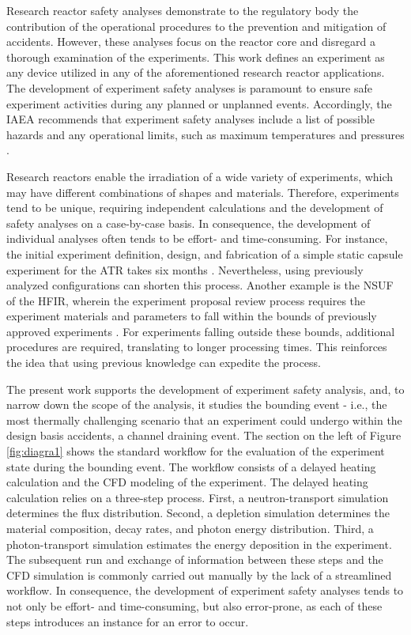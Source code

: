 Research reactor safety analyses demonstrate to the regulatory body the contribution of the operational procedures to the prevention and mitigation of accidents.
However, these analyses focus on the reactor core and disregard a thorough examination of the experiments.
This work defines an experiment as any device utilized in any of the aforementioned research reactor applications.
The development of experiment safety analyses is paramount to ensure safe experiment activities during any planned or unplanned events.
Accordingly, the \gls*{IAEA} recommends that experiment safety analyses include a list of possible hazards and any operational limits, such as maximum temperatures and pressures \cite{noauthor_safety_2012}.

Research reactors enable the irradiation of a wide variety of experiments, which may have different combinations of shapes and materials.
Therefore, experiments tend to be unique, requiring independent calculations and the development of safety analyses on a case-by-case basis.
In consequence, the development of individual analyses often tends to be effort- and time-consuming.
For instance, the initial experiment definition, design, and fabrication of a simple static capsule experiment for the \gls*{ATR} takes six months \cite{inl_advanced_2009}.
Nevertheless, using previously analyzed configurations can shorten this process.
%
Another example is the \gls*{NSUF} of the \gls*{HFIR}, wherein the experiment proposal review process requires the experiment materials and parameters to fall within the bounds of previously approved experiments \cite{hfir}.
For experiments falling outside these bounds, additional procedures are required, translating to longer processing times.
This reinforces the idea that using previous knowledge can expedite the process.

The present work supports the development of experiment safety analysis, and, to narrow down the scope of the analysis, it studies the bounding event - i.e., the most thermally challenging scenario that an experiment could undergo within the design basis accidents, a channel draining event.
The section on the left of Figure \ref{fig:diagra1} shows the standard workflow for the evaluation of the experiment state during the bounding event.
The workflow consists of a delayed heating calculation and the \gls*{CFD} modeling of the experiment.
The delayed heating calculation relies on a three-step process.
First, a neutron-transport simulation determines the flux distribution.
Second, a depletion simulation determines the material composition, decay rates, and photon energy distribution.
Third, a photon-transport simulation estimates the energy deposition in the experiment.
The subsequent run and exchange of information between these steps and the CFD simulation is commonly carried out manually by the lack of a streamlined workflow.
In consequence, the development of experiment safety analyses tends to not only be effort- and time-consuming, but also error-prone, as each of these steps introduces an instance for an error to occur.

